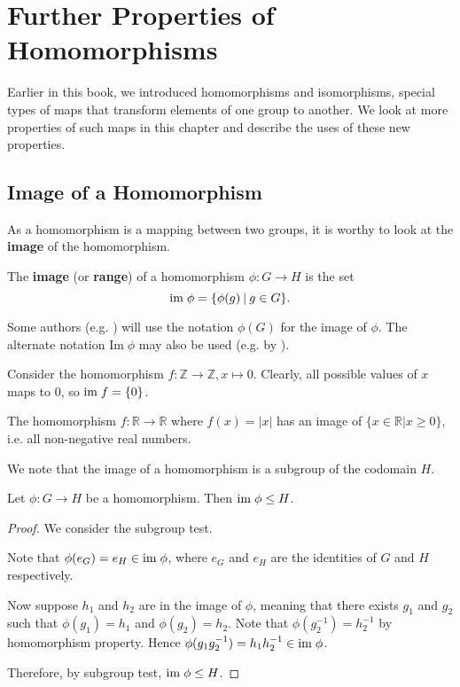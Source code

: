 \chapter{Further Properties of Homomorphisms}
Earlier in this book, we introduced homomorphisms and isomorphisms, special types of maps that transform elements of one group to another. We look at more properties of such maps in this chapter and describe the uses of these new properties.

\section{Image of a Homomorphism}
As a homomorphism is a mapping between two groups, it is worthy to look at the \textbf{image} of the homomorphism.
\begin{definition}
    The \textbf{image} (or \textbf{range}) of a homomorphism $\phi: G \to H$ is the set
    \[
        \im\phi = \{\phi(g) \vert g \in G\}.
    \]
\end{definition}
\begin{remark}
    Some authors (e.g. \cite{libretexts_im-and-ker}) will use the notation $\phi(G)$ for the image of $\phi$. The alternate notation $\mathrm{Im}\;\phi$ may also be used (e.g. by \cite{clark_1984, hungerford_1980}).
\end{remark}

\begin{example}
    Consider the homomorphism $f: \mathbb{Z} \to \mathbb{Z}, x \mapsto 0$. Clearly, all possible values of $x$ maps to 0, so $\mathrm{im}\; f = \{0\}$.
\end{example}
\begin{example}
    The homomorphism $f: \mathbb{R} \to \mathbb{R}$ where $f(x) = |x|$ has an image of $\{x \in \mathbb{R} \vert x \geq 0\}$, i.e. all non-negative real numbers.
\end{example}

We note that the image of a homomorphism is a subgroup of the codomain $H$.
\begin{proposition}\label{prop-image-is-subgroup-of-codomain}
    Let $\phi: G \to H$ be a homomorphism. Then $\mathrm{im}\;\phi \leq H$.
\end{proposition}
\begin{proof}
    We consider the subgroup test.
    
    Note that $\phi(e_G) = e_H \in \mathrm{im}\;\phi$, where $e_G$ and $e_H$ are the identities of $G$ and $H$ respectively.
    
    Now suppose $h_1$ and $h_2$ are in the image of $\phi$, meaning that there exists $g_1$ and $g_2$ such that $\phi(g_1) = h_1$ and $\phi(g_2) = h_2$. Note that $\phi(g_2^{-1}) = h_2^{-1}$ by homomorphism property. Hence $\phi(g_1g_2^{-1}) = h_1h_2^{-1} \in \mathrm{im}\;\phi$.

    Therefore, by subgroup test, $\mathrm{im}\;\phi \leq H$.
\end{proof}

